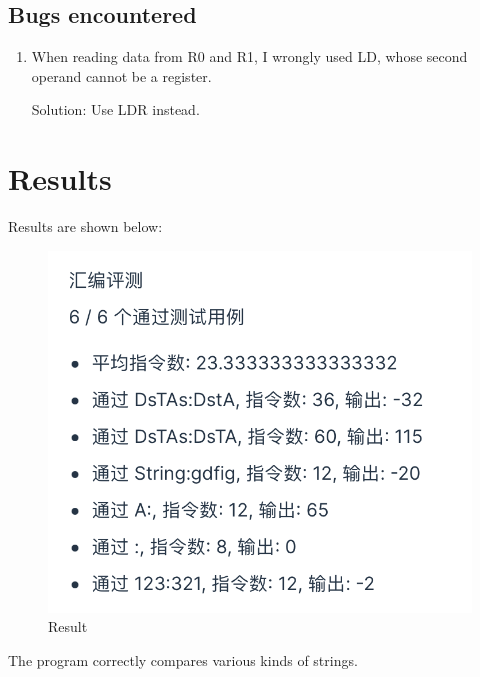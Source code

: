 \documentclass[UTF8]{ctexart}
\begin{document}
\subsection{Bugs encountered}
\begin{enumerate}
  \item When reading data from R0 and R1, I wrongly used LD, whose second operand cannot be a register.
  
  Solution: Use LDR instead.
\end{enumerate}

\section{Results}
Results are shown below:
\begin{figure}[h]
        \centering
        \includegraphics[scale=0.5]{result.png}
        \caption{Result}
\end{figure}

The program correctly compares various kinds of strings.


\end{document}

